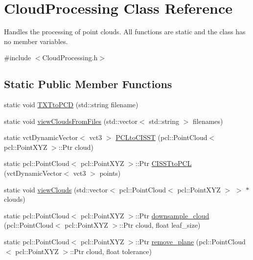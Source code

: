 \hypertarget{class_cloud_processing}{}\section{Cloud\+Processing Class Reference}
\label{class_cloud_processing}


Handles the processing of point clouds. All functions are static and the class has no member variables.  




{\ttfamily \#include $<$Cloud\+Processing.\+h$>$}

\subsection*{Static Public Member Functions}
\begin{DoxyCompactItemize}
\item 
static void \hyperlink{class_cloud_processing_aef2ec63d577ce493f24c69e2a6d68ca7}{T\+X\+Tto\+P\+CD} (std\+::string filename)
\item 
static void \hyperlink{class_cloud_processing_a8a3e98139d08714e346ccfe0d8cbb240}{view\+Clouds\+From\+Files} (std\+::vector$<$ std\+::string $>$ filenames)
\item 
static vct\+Dynamic\+Vector$<$ vct3 $>$ \hyperlink{class_cloud_processing_a87725c89d18cdb9f31ecd5ccbe3daf87}{P\+C\+Lto\+C\+I\+S\+ST} (pcl\+::\+Point\+Cloud$<$ pcl\+::\+Point\+X\+YZ $>$\+::Ptr cloud)
\item 
static pcl\+::\+Point\+Cloud$<$ pcl\+::\+Point\+X\+YZ $>$\+::Ptr \hyperlink{class_cloud_processing_a8236eb8ff46125992a136661ca26051d}{C\+I\+S\+S\+Tto\+P\+CL} (vct\+Dynamic\+Vector$<$ vct3 $>$ points)
\item 
static void \hyperlink{class_cloud_processing_aed3aed29847bc8eaca0e68994abf7f01}{view\+Clouds} (std\+::vector$<$ pcl\+::\+Point\+Cloud$<$ pcl\+::\+Point\+X\+YZ $>$ $>$ $\ast$clouds)
\item 
static pcl\+::\+Point\+Cloud$<$ pcl\+::\+Point\+X\+YZ $>$\+::Ptr \hyperlink{class_cloud_processing_ae58e471bf180c4ddda64c02f69fee331}{downsample\+\_\+cloud} (pcl\+::\+Point\+Cloud$<$ pcl\+::\+Point\+X\+YZ $>$\+::Ptr cloud, float leaf\+\_\+size)
\item 
static pcl\+::\+Point\+Cloud$<$ pcl\+::\+Point\+X\+YZ $>$\+::Ptr \hyperlink{class_cloud_processing_a41c6b9aa981bd642f22d4272a2dc7666}{remove\+\_\+plane} (pcl\+::\+Point\+Cloud$<$ pcl\+::\+Point\+X\+YZ $>$\+::Ptr cloud, float tolerance)
\end{DoxyCompactItemize}



